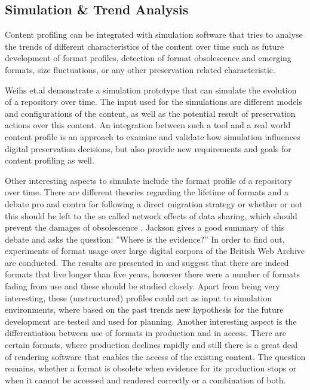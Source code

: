 
\subsection{Simulation \& Trend Analysis}
Content profiling can be integrated with simulation software that tries to analyse the trends of different characteristics of the content over time such as future development of format profiles, detection of format obsolescence and emerging formats, size fluctuations, or any other preservation related characteristic.

Weihs et.al demonstrate a simulation prototype \cite{TUW-206758} that can simulate the evolution of a repository over time. The input used for the simulations are different models and configurations of the content, as well as the potential result of preservation actions over this content. An integration between such a tool and a real world content profile is an approach to examine and validate how simulation influences digital preservation decisions, but also provide new requirements and goals for content profiling  as well.

Other interesting aspects to simulate include the format profile of a repository over time. There are different theories regarding the lifetime of formats and a debate pro and contra for following a direct migration strategy or whether or not this should be left to the so called network effects of data sharing, which should prevent the damages of obsolescence \cite{Rosenthal:1January2010:0737-8831:195}. Jackson gives a good summary of this debate and asks the question: ''Where is the evidence?'' In order to find out, experiments of format usage over large digital corpora of the British Web Archive are conducted. The results are presented in \cite{journals/corr/abs-1210-1714} and suggest that there are indeed formats that live longer than five years, however there were a number of formats fading from use and these should be studied closely. Apart from being very interesting, these (unstructured) profiles could act as input to simulation environments, where based on the past trends new hypothesis for the future development are tested and used for planning. Another interesting aspect is the differentiation between use of formats in production and in access. There are certain formats, where production declines rapidly and still there is a great deal of rendering software that enables the access of the existing content. The question remains, whether a format is obsolete when evidence for its production stops or when it cannot be accessed and rendered correctly or a combination of both.

